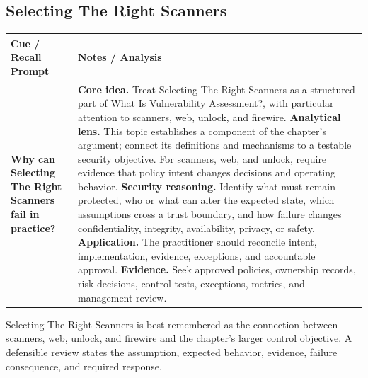 \documentclass[11pt]{article}
\newcommand{\CornellHeader}{%
\rowcolor{Navy}\color{white}\bfseries Cue / Recall Prompt & \color{white}\bfseries Notes / Analysis\\\hline}
\newcommand{\CornellRow}[2]{%
\cellcolor{CueGray}\RaggedRight\textbf{#1} & \RaggedRight #2\\\hline}
\begin{document}
\subsection*{Selecting The Right Scanners}
\begin{longtable}{>{\RaggedRight\arraybackslash}p{}|>{\RaggedRight\arraybackslash}p{}}
\CornellHeader
\CornellRow{Why can Selecting The Right Scanners fail in practice?}{\textbf{Core idea.} Treat Selecting The Right Scanners as a structured part of What Is Vulnerability Assessment?, with particular attention to scanners, web, unlock, and firewire. \textbf{Analytical lens.} This topic establishes a component of the chapter's argument; connect its definitions and mechanisms to a testable security objective. For scanners, web, and unlock, require evidence that policy intent changes decisions and operating behavior. \textbf{Security reasoning.} Identify what must remain protected, who or what can alter the expected state, which assumptions cross a trust boundary, and how failure changes confidentiality, integrity, availability, privacy, or safety. \textbf{Application.} The practitioner should reconcile intent, implementation, evidence, exceptions, and accountable approval. \textbf{Evidence.} Seek approved policies, ownership records, risk decisions, control tests, exceptions, metrics, and management review.}
\end{longtable}
\begin{topicsummary}
Selecting The Right Scanners is best remembered as the connection between scanners, web, unlock, and firewire and the chapter's larger control objective. A defensible review states the assumption, expected behavior, evidence, failure consequence, and required response.
\end{topicsummary}
\end{document}
